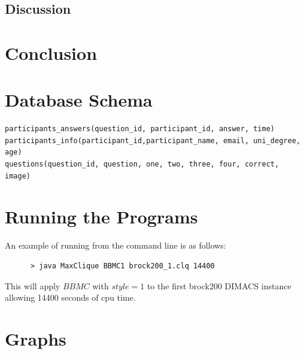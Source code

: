 \documentclass{l4proj}
\begin{document}
\section{Discussion}

\chapter{Conclusion}


\begin{appendices}

\chapter{Database Schema}

\begin{verbatim}
participants_answers(question_id, participant_id, answer, time)
participants_info(participant_id,participant_name, email, uni_degree, age)
questions(question_id, question, one, two, three, four, correct, image)
\end{verbatim}


\chapter{Running the Programs}
An example of running from the command line is as follows:
\begin{verbatim}
      > java MaxClique BBMC1 brock200_1.clq 14400
\end{verbatim}
This will apply $BBMC$ with $style = 1$ to the first brock200 DIMACS instance allowing 14400 seconds of cpu time.

\chapter{Graphs}


\end{appendices}
\end{document}
